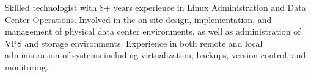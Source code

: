 
\begin{cvparagraph}

	{Skilled technologist with 8+ years experience in Linux Administration and Data Center Operations. Involved in the on-site design, implementation, and management of physical data center environments, as well as administration of VPS and storage environments. Experience in both remote and local administration of systems including virtualization, backups, version control, and monitoring.}
	
\end{cvparagraph}
